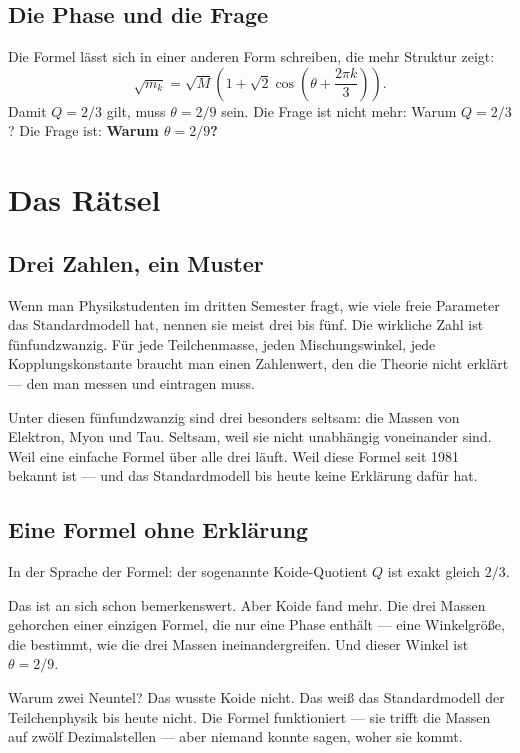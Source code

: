\documentclass[12pt,oneside]{book}
\begin{document}
\section{Die Phase und die Frage}

Die Formel lässt sich in einer anderen Form schreiben, die mehr Struktur zeigt:
\[
\sqrt{m_k} = \sqrt{M} \left(1 + \sqrt{2} \cos\left(\theta + \frac{2\pi k}{3}\right)\right).
\]
Damit $Q = 2/3$ gilt, muss $\theta = 2/9$ sein. Die Frage ist nicht mehr: Warum $Q = 2/3$? Die Frage ist: \textbf{Warum $\theta = 2/9$?}

\chapter{Das Rätsel}

\section{Drei Zahlen, ein Muster}

Wenn man Physikstudenten im dritten Semester fragt, wie viele freie Parameter das Standardmodell hat, nennen sie meist drei bis fünf. Die wirkliche Zahl ist fünfundzwanzig. Für jede Teilchenmasse, jeden Mischungswinkel, jede Kopplungskonstante braucht man einen Zahlenwert, den die Theorie nicht erklärt — den man messen und eintragen muss.

Unter diesen fünfundzwanzig sind drei besonders seltsam: die Massen von Elektron, Myon und Tau. Seltsam, weil sie nicht unabhängig voneinander sind. Weil eine einfache Formel über alle drei läuft. Weil diese Formel seit 1981 bekannt ist — und das Standardmodell bis heute keine Erklärung dafür hat.

\section{Eine Formel ohne Erklärung}

In der Sprache der Formel: der sogenannte Koide-Quotient $Q$ ist exakt gleich $2/3$.

Das ist an sich schon bemerkenswert. Aber Koide fand mehr. Die drei Massen gehorchen einer einzigen Formel, die nur eine Phase enthält — eine Winkelgröße, die bestimmt, wie die drei Massen ineinandergreifen. Und dieser Winkel ist $\theta = 2/9$.

Warum zwei Neuntel? Das wusste Koide nicht. Das weiß das Standardmodell der Teilchenphysik bis heute nicht. Die Formel funktioniert — sie trifft die Massen auf zwölf Dezimalstellen — aber niemand konnte sagen, woher sie kommt.
\end{document}
